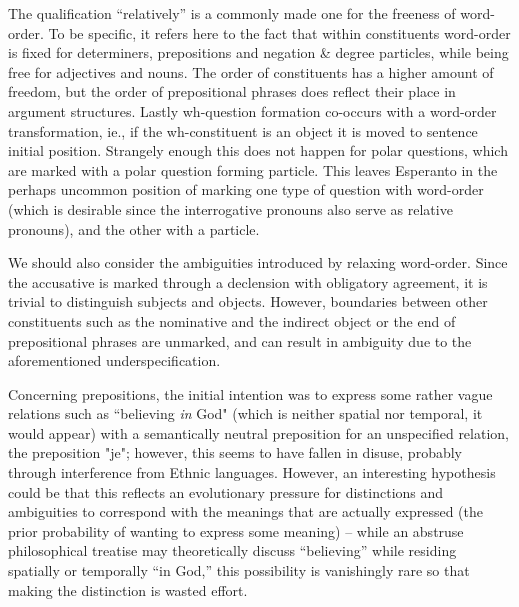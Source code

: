 \documentclass[10pt,a4paper]{article}
\begin{document}
The qualification ``relatively'' is a commonly made one for the freeness of
word-order. To be specific, it refers here to the fact that within
constituents word-order is fixed for determiners, prepositions and negation
\& degree particles, while being free for adjectives and nouns. The order of
constituents has a higher amount of freedom, but the order of prepositional
phrases does reflect their place in argument structures. Lastly wh-question formation
co-occurs with a word-order transformation, ie., if the wh-constituent is an
object it is moved to sentence initial position.  Strangely enough
this does not happen for polar questions, which are marked with a
polar question forming particle. This leaves Esperanto in the perhaps uncommon position
of marking one type of question with word-order (which is desirable since the
interrogative pronouns also serve as relative pronouns), and the other with a particle.

We should also consider the ambiguities introduced by relaxing word-order.
Since the accusative is marked through a declension with obligatory agreement,
it is trivial to distinguish subjects and objects. However, boundaries between
other constituents such as the nominative and the indirect object or the end of
prepositional phrases are unmarked, and can result in ambiguity due to the
aforementioned underspecification.

Concerning prepositions, the initial intention was to express some rather vague
relations such as ``believing {\em in} God" (which is neither spatial nor
temporal, it would appear) with a semantically neutral preposition for an
unspecified relation, the preposition "je"; however, this seems to have fallen
in disuse, probably through interference from Ethnic languages. However, an
interesting hypothesis could be that this reflects an evolutionary pressure for
distinctions and ambiguities to correspond with the meanings that are actually
expressed (the prior probability of wanting to express some meaning) -- while
an abstruse philosophical treatise may theoretically discuss ``believing'' while
residing spatially or temporally ``in God,'' this possibility is vanishingly rare
so that making the distinction is wasted effort.
\end{document}
